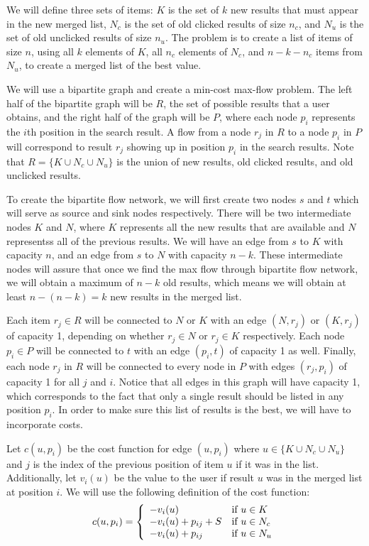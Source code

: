 \documentclass[psamsfonts]{amsart}
\newenvironment{sol}{\vspace{0.25cm}{\large \bfseries Solution:}}{\qedsymbol}
\begin{document}
\begin{sol}
We will define three sets of items: $K$ is the set of $k$ new results that must appear in the new merged list, $N_c$ is the set of old clicked results of size $n_c$, and $N_u$ is the set of old unclicked results of size $n_u$. The problem is to create a list of items of size $n$, using all $k$ elements of $K$, all $n_c$ elements of $N_c$, and $n - k - n_c$ items from $N_u$, to create a merged list of the best value.

We will use a bipartite graph and create a min-cost max-flow problem. The left half of the bipartite graph will be $R$, the set of possible results that a user obtains, and the right half of the graph will be $P$, where each node $p_i$ represents the $i$th position in the search result. A flow from a node $r_j$ in $R$ to a node $p_i$ in $P$ will correspond to result $r_j$ showing up in position $p_i$ in the search results. Note that $R = \{ K \cup N_c \cup N_u \}$ is the union of new results, old clicked results, and old unclicked results.

To create the bipartite flow network, we will first create two nodes $s$ and $t$ which will serve as source and sink nodes respectively. There will be two intermediate nodes $K$ and $N$, where $K$ represents all the new results that are available and $N$ representss all of the previous results. We will have an edge from $s$ to $K$ with capacity $n$, and an edge from $s$ to $N$ with capacity $n-k$. These intermediate nodes will assure that once we find the max flow through bipartite flow network, we will obtain a maximum of $n-k$ old results, which means we will obtain at least $n - (n-k) = k$ new results in the merged list.

Each item $r_j \in R$ will be connected to $N$ or $K$ with an edge $(N, r_j)$ or $(K, r_j)$ of capacity 1, depending on whether $r_j \in N$ or $r_j \in K$ respectively. Each node $p_i \in P$ will be connected to $t$ with an edge $(p_i, t)$ of capacity 1 as well. Finally, each node $r_j$ in $R$ will be connected to every node in $P$ with edges $(r_j, p_i)$ of capacity 1 for all $j$ and $i$. Notice that all edges in this graph will have capacity 1, which corresponds to the fact that only a single result should be listed in any position $p_i$. In order to make sure this list of results is the best, we will have to incorporate costs.

Let $c(u,p_i)$ be the cost function for edge $(u, p_i)$ where $u \in \{K \cup N_c \cup N_u \}$ and $j$ is the index of the previous position of item $u$ if it was in the list. Additionally, let $v_i(u)$ be the value to the user if result $u$ was in the merged list at position $i$. We will use the following definition of the cost function:
\begin{eqnarray}
c(u,p_i) = \left\{ \begin{array}{l l}
-v_i(u) & \text{if } u \in K \\
-v_i(u) + p_{ij} + S & \text{if } u \in N_c \\
-v_i(u) + p_{ij} & \text{if } u \in N_u
\end{array} \right.
\end{eqnarray}


\end{sol}
\end{document}
